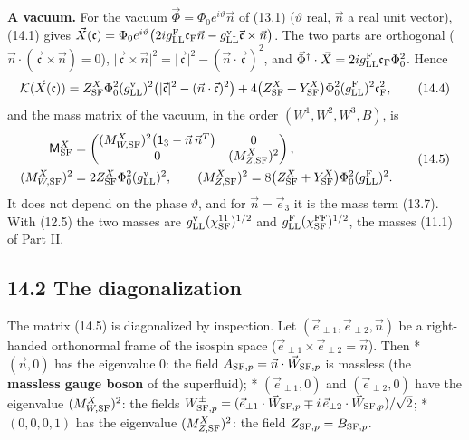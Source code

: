 \documentclass[
  10pt,
]{article}
\begin{document}
\textbf{A vacuum.} For the vacuum
\(\vec\Phi=\Phi_0e^{i\vartheta}\vec n\) of (13.1) (\(\vartheta\) real,
\(\vec n\) a real unit vector), (14.1) gives
\(\vec X(\mathfrak c)=\Phi_0e^{i\vartheta}\big(2ig^{\rm F}_{\rm LL}\mathfrak c_{\rm F}\vec n-g^{\rm v}_{\rm LL}\vec{\mathfrak c}\times\vec n\big)\).
The two parts are orthogonal
(\(\vec n\cdot(\vec{\mathfrak c}\times\vec n)=0\)),
\(\lvert\vec{\mathfrak c}\times\vec n\rvert^2=\lvert\vec{\mathfrak c}\rvert^2-(\vec n\cdot\vec{\mathfrak c})^2\),
and
\(\vec\Phi^\dagger\cdot\vec X=2ig^{\rm F}_{\rm LL}\mathfrak c_{\rm F}\Phi_0^2\).
Hence
\[\mathcal K(\vec X(\mathfrak c))=Z^X_{\rm SF}\Phi_0^2(g^{\rm v}_{\rm LL})^2\big(\lvert\vec{\mathfrak c}\rvert^2-(\vec n\cdot\vec{\mathfrak c})^2\big)+4\big(Z^X_{\rm SF}+Y^X_{\rm SF}\big)\Phi_0^2(g^{\rm F}_{\rm LL})^2\mathfrak c_{\rm F}^2,\tag{14.4}\]
and the mass matrix of the vacuum, in the order \((W^1,W^2,W^3,B)\), is
\[\begin{aligned}\mathsf M^X_{\rm SF}&=\begin{pmatrix}(M^X_{W,{\rm SF}})^2\big(\mathsf 1_3-\vec n\,\vec n^T\big)&0\\0&(M^X_{Z,{\rm SF}})^2\end{pmatrix},\\(M^X_{W,{\rm SF}})^2&=2Z^X_{\rm SF}\Phi_0^2(g^{\rm v}_{\rm LL})^2,\qquad(M^X_{Z,{\rm SF}})^2=8\big(Z^X_{\rm SF}+Y^X_{\rm SF}\big)\Phi_0^2(g^{\rm F}_{\rm LL})^2.\end{aligned}\tag{14.5}\]
It does not depend on the phase \(\vartheta\), and for
\(\vec n=\vec e_3\) it is the mass term (13.7). With (12.5) the two
masses are \(g^{\rm v}_{\rm LL}(\chi^{11}_{\rm SF})^{1/2}\) and
\(g^{\rm F}_{\rm LL}(\chi^{\rm FF}_{\rm SF})^{1/2}\), the masses (11.1)
of Part II.

\hypertarget{the-diagonalization}{%
\subsection{14.2 The diagonalization}\label{the-diagonalization}}

The matrix (14.5) is diagonalized by inspection. Let
\((\vec e_{\perp1},\vec e_{\perp2},\vec n)\) be a right-handed
orthonormal frame of the isospin space
(\(\vec e_{\perp1}\times\vec e_{\perp2}=\vec n\)). Then * \((\vec n,0)\)
has the eigenvalue \(0\): the field
\(A_{{\rm SF},p}=\vec n\cdot\vec W_{{\rm SF},p}\) is massless (the
\textbf{massless gauge boson} of the superfluid); *
\((\vec e_{\perp1},0)\) and \((\vec e_{\perp2},0)\) have the eigenvalue
\((M^X_{W,{\rm SF}})^2\): the fields
\(W^\pm_{{\rm SF},p}=(\vec e_{\perp1}\cdot\vec W_{{\rm SF},p}\mp i\,\vec e_{\perp2}\cdot\vec W_{{\rm SF},p})/\sqrt2\);
* \((0,0,0,1)\) has the eigenvalue \((M^X_{Z,{\rm SF}})^2\): the field
\(Z_{{\rm SF},p}=B_{{\rm SF},p}\).
\end{document}
